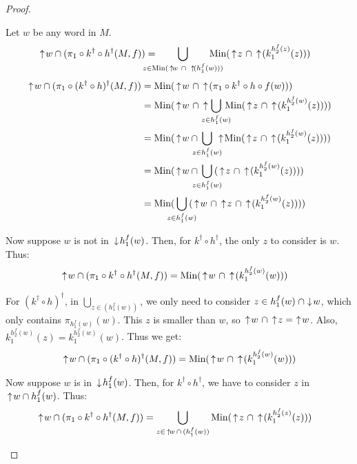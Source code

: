 \begin{proof}
\begin{description}
Let $w$ be any word in $M$.
\begin{align*}
\ua w\cap (\pi_1\circ k^\dagger\circ h^\dagger (M,f)) 
&= \hspace{-16pt}\bigcup_{z\in\Min(\ua w\ \cap\ \ua(h_1^f(w)))}\hspace{-16pt}\Min(\ua z\ \cap\ua(k_1^{h_2^f(z)}(z)))
\end{align*}
\begin{align*}
\ua w\cap (\pi_1\circ (k^\dagger\circ h)^\dagger (M,f))
&= \Min(\ua w\ \cap\ua(\pi_1\circ k^\dagger\circ h\circ f(w))) \\
&= \Min(\ua w\ \cap\ua\hspace{-8pt}\bigcup_{z\in h_1^f(w)}\hspace{-8pt}\Min(\ua z\ \cap\ua(k_1^{h_2^f(w)}(z)))) \\
&= \Min(\ua w\cap\hspace{-8pt}\bigcup_{z\in h_1^f(w)}\hspace{-8pt}\ua\Min(\ua z\ \cap\ua(k_1^{h_2^f(w)}(z)))) \\
&= \Min(\ua w\cap\hspace{-8pt}\bigcup_{z\in h_1^f(w)}\hspace{-8pt}(\ua z\ \cap\ua(k_1^{h_2^f(w)}(z)))) \\
&= \Min(\hspace{-8pt}\bigcup_{z\in h_1^f(w)}\hspace{-8pt}(\ua w\ \cap\ua z\ \cap\ua(k_1^{h_2^f(w)}(z))))
\end{align*}

Now suppose $w$ is not in $\,\downarrow\! h_1^f(w)$. Then, for $k^\dagger\circ h^\dagger$, the only $z$ to consider is $w$.  Thus:
\begin{align*}
\,\uparrow\! w\cap (\pi_1\circ k^\dagger\circ h^\dagger (M,f)) 
&= \textrm{Min}(\,\uparrow\! w\ \cap\,\uparrow\!(k_1^{h_2^f(w)}(w)))
\end{align*}

For $(k^\dagger\circ h)^\dagger$, in $\bigcup_{z\in (h_1^f(w))}$, we only need to consider 
$z\in h_1^f(w)\; \cap\! \,\downarrow\! w$, which only contains $\pi_{h_1^f(w)}(w)$.  This $z$ is smaller
than $w$, so $\,\uparrow\! w\ \cap \,\uparrow\! z =\, \,\uparrow\! w$. Also, $
k_1^{h_2^f(w)}(z) = k_1^{h_2^f(w)}(w)$.  Thus we get:
\begin{align*}
\,\uparrow\! w\cap (\pi_1\circ (k^\dagger\circ h)^\dagger (M,f))
= \textrm{Min}(\,\uparrow\! w\ \cap\,\uparrow\!(k_1^{h_2^f(w)}(w)))
\end{align*}

Now suppose $w$ is in $\,\downarrow\! h_1^f(w)$. Then, for $k^\dagger\circ h^\dagger$, we have to consider $z$ in $\,\uparrow\! w\cap h_1^f(w)$.  Thus:
\begin{align*}
\ua w\cap (\pi_1\circ k^\dagger\circ h^\dagger (M,f)) 
&= \bigcup_{z\in \ua w\,\cap\,(h_1^f(w))}\Min(\ua z\ \cap\ua(k_1^{h_2^f(z)}(z)))
\end{align*}


\end{description}
\end{proof}

